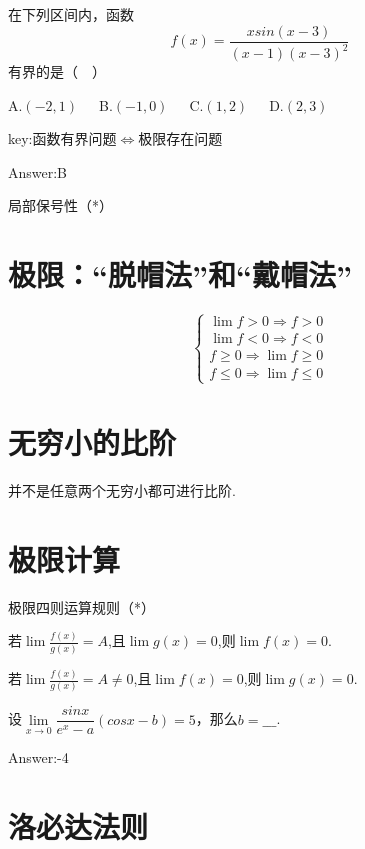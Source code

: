 \documentclass[12pt, a4paper, oneside]{ctexbook}
\begin{document}
\hspace*{\fill}

在下列区间内，函数
\[f(x)=\frac{xsin(x-3)}{(x-1)(x-3)^2}\]
有界的是（\ \ ）

A.$(-2,1)$\ \ \ B.$(-1,0)$\ \ \ C.$(1,2)$\ \ \ D.$(2,3)$

key:函数有界问题$\iff$极限存在问题

Answer:B

\hspace*{\fill}

局部保号性（*）

\section{极限：“脱帽法”和“戴帽法”}

$$
    \begin{cases}
	   \lim f > 0 \Rightarrow f > 0 \\
		\lim f < 0 \Rightarrow f < 0 \\
       f \geq 0 \Rightarrow \lim f \geq 0 \\
		f \leq 0 \Rightarrow \lim f \leq 0 

    \end{cases}
$$

\section{无穷小的比阶}

并不是任意两个无穷小都可进行比阶.

\section{极限计算}

极限四则运算规则（*）

\hspace*{\fill}

若$\lim \frac{f(x)}{g(x)}= A$,且$\lim g(x)=0$,则$\lim f(x)=0$.

若$\lim \frac{f(x)}{g(x)}= A \neq 0$,且$\lim f(x)=0$,则$\lim g(x)=0$.

\hspace*{\fill}

设$\lim\limits_{x \to 0} \dfrac{sinx}{e^x - a}(cosx - b)=5$，那么$b=\_\_\_$.

Answer:-4

\section{洛必达法则}
\end{document}
